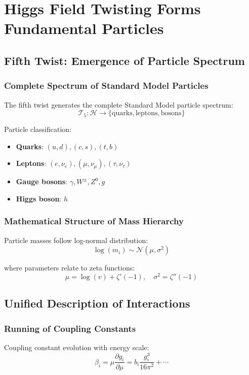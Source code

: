 \documentclass[11pt]{article}
\begin{document}
\section{Higgs Field Twisting Forms Fundamental Particles}

\subsection{Fifth Twist: Emergence of Particle Spectrum}

\subsubsection{Complete Spectrum of Standard Model Particles}

The fifth twist generates the complete Standard Model particle spectrum:
$$\mathcal{T}_5: \mathcal{H} \to \{\text{quarks}, \text{leptons}, \text{bosons}\}$$

Particle classification:
\begin{itemize}
\item \textbf{Quarks}: $(u,d), (c,s), (t,b)$
\item \textbf{Leptons}: $(e,\nu_e), (\mu,\nu_{\mu}), (\tau,\nu_{\tau})$
\item \textbf{Gauge bosons}: $\gamma, W^{\pm}, Z^0, g$
\item \textbf{Higgs boson}: $h$
\end{itemize}

\subsubsection{Mathematical Structure of Mass Hierarchy}

Particle masses follow log-normal distribution:
$$\log(m_i) \sim \mathcal{N}(\mu, \sigma^2)$$

where parameters relate to zeta functions:
$$\mu = \log(v) + \zeta'(-1), \quad \sigma^2 = \zeta''(-1)$$

\subsection{Unified Description of Interactions}

\subsubsection{Running of Coupling Constants}

Coupling constant evolution with energy scale:
$$\beta_i = \mu \frac{\partial g_i}{\partial \mu} = b_i \frac{g_i^3}{16\pi^2} + \cdots$$
\end{document}

